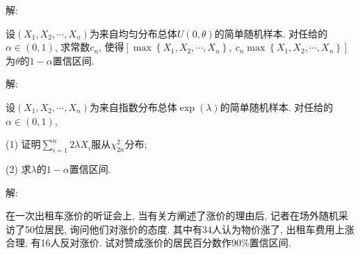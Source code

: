 \documentclass[standard]{ExBook}
\begin{document}
\begin{qitems}
\vspace{-5em}

    \begin{bbox}
解: 
    \end{bbox}

\vspace{-5em}

    \begin{bbox}
    \begin{shaded}
        \qitem
设$(X_1,X_2,\cdots,X_n)$为来自均匀分布总体$U(0,\theta)$的简单随机样本. 对任给的$\alpha \in (0,1)$, 求常数$c_n$, 使得$\left[\max\left\{X_1,X_2,\cdots,X_n\right\},\ c_n \max\left\{X_1,X_2,\cdots,X_n\right\}\right]$为$\theta$的$1-\alpha$置信区间.
    \end{shaded}
    \end{bbox}

\vspace{-5em}

    \begin{bbox}
解: 
    \end{bbox}

\vspace{-5em}

    \begin{bbox}
    \begin{shaded}
        \qitem
设$(X_1,X_2,\cdots,X_n)$为来自指数分布总体$\exp(\lambda)$的简单随机样本. 对任给的$\alpha\in(0,1)$,

(1) 证明$\sum\limits_{i=1}^{n}2\lambda X_i$服从$\chi_{2n}^{2}$分布;

(2) 求$\lambda$的$1-\alpha$置信区间.
    \end{shaded}
    \end{bbox}

\vspace{-5em}

    \begin{bbox}
解: 
    \end{bbox}

\vspace{-5em}

    \begin{bbox}
    \begin{shaded}
        \qitem
在一次出租车涨价的听证会上, 当有关方阐述了涨价的理由后, 记者在场外随机采访了50位居民, 询问他们对涨价的态度. 其中有34人认为物价涨了, 出租车费用上涨合理, 有16人反对涨价. 试对赞成涨价的居民百分数作90\%置信区间.
    \end{shaded}
    \end{bbox}


\end{qitems}
\end{document}
